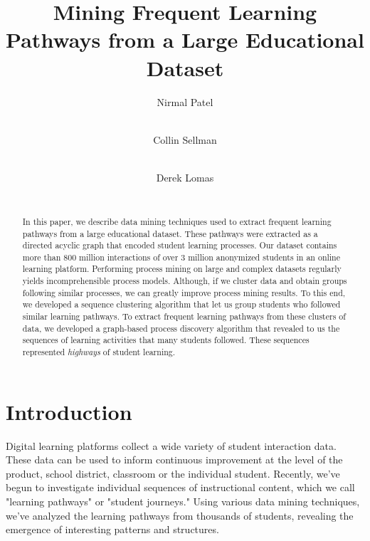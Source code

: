 \documentclass{edm_template}
\begin{document}
\title{Mining Frequent Learning Pathways from a Large Educational Dataset}

%
\author{
Nirmal Patel \\  \\  \and
Collin Sellman \\  \\  \and
Derek Lomas \\  \\ 
}

\maketitle
\begin{abstract}
In this paper, we describe data mining techniques used to extract frequent learning pathways from a large educational dataset. These pathways were extracted as a directed acyclic graph that encoded student learning processes. Our dataset contains more than 800 million interactions of over 3 million anonymized students in an online learning platform. Performing process mining on large and complex datasets regularly yields incomprehensible process models. Although, if we cluster data and obtain groups following similar processes, we can greatly improve process mining results. To this end, we developed a sequence clustering algorithm that let us group students who followed similar learning pathways. To extract frequent learning pathways from these clusters of data, we developed a graph-based process discovery algorithm that revealed to us the sequences of learning activities that many students followed. These sequences represented \textit{highways} of student learning. 
\end{abstract}


\section{Introduction}
Digital learning platforms collect a wide variety of student interaction data. These data can be used to inform continuous improvement at the level of the product, school district, classroom or the individual student. Recently, we've begun to investigate individual sequences of instructional content, which we call "learning pathways" or "student journeys."  Using various data mining techniques, we've analyzed the learning pathways from thousands of students, revealing the emergence of interesting patterns and structures.
\end{document}
